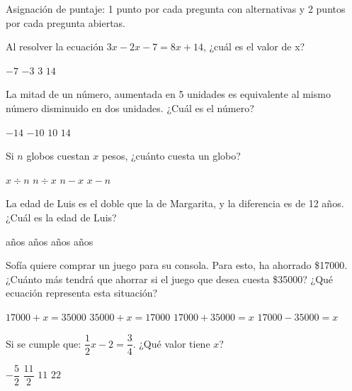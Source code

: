 \documentclass[sin curso]{plantilla-evaluacion-v1}
\begin{document}
\begin{center}
  \vspace*{5pt}
  \begin{tcolorbox}[borderline={1pt}{0pt}{black,dashed},colframe=white,colback=white]
    Asignación de puntaje: 1 punto por cada pregunta con alternativas y 2 puntos por cada pregunta abiertas.
  \end{tcolorbox}
  \vspace*{5pt}
\end{center}

\begin{partes}
  \parte Al resolver la ecuación $3x-2x-7=8x+14$, ¿cuál es el valor de x?
  \begin{vertical}
    \alternativa $-7$
    \alternativa $-3$
    \alternativa $3$
    \alternativa $14$
  \end{vertical}

  \parte La mitad de un número, aumentada en 5 unidades es equivalente al mismo
  número disminuido en dos unidades. ¿Cuál es el número?
  \begin{vertical}
    \alternativa $-14$
    \alternativa $-10$
    \alternativa $10$
    \alternativa $14$
  \end{vertical}

  \parte Si $n$ globos cuestan $x$ pesos, ¿cuánto cuesta un globo?
  \begin{vertical}
    \alternativa $x\div n$
    \alternativa $n\div x$
    \alternativa $n-x$
    \alternativa $x-n$
  \end{vertical}

  \parte La edad de Luis es el doble que la de Margarita, y la diferencia es de 
  12 años. ¿Cuál es la edad de Luis? 
  \begin{vertical}
     años
     años
     años
     años
  \end{vertical}

  \parte Sofía quiere comprar un juego para su consola. Para esto, ha ahorrado
  \$17000. ¿Cuánto más tendrá que ahorrar si el juego que desea cuesta \$35000?
  ¿Qué ecuación representa esta situación? 
  \begin{vertical}
    \alternativa $17000 +x=35000$
    \alternativa $35000 +x=17000$
    \alternativa $17000 +35000=x$
    \alternativa $17000 -35000=x$
  \end{vertical}

  \parte Si se cumple que: $\dfrac{1}{2}x-2=\dfrac{3}{4}$. ¿Qué valor tiene $x$? 
  \begin{vertical}[itemsep=5pt]
    \alternativa $-\dfrac{5}{2}$
    \alternativa $\dfrac{11}{2}$
    \alternativa $11$
    \alternativa $22$
  \end{vertical}


\end{partes}
\end{document}
